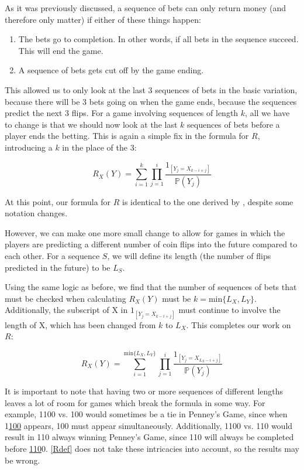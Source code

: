 \documentclass[english,12pt,a4paper,final]{article}
\begin{document}
As it was previously discussed, a sequence of bets can only return money (and therefore only matter) if either of these things happen:
\begin{enumerate}
	\item The bets go to completion. In other words, if all bets in the sequence succeed. This will end the game.
	\item A sequence of bets gets cut off by the game ending.
\end{enumerate}

This allowed us to only look at the last 3 sequences of bets in the basic variation, because there will be 3 bets going on when the game ends, because the sequences predict the next 3 flips. For a game involving sequences of length $k$, all we have to change is that we should now look at the last $k$ sequences of bets before a player ends the betting. This is again a simple fix in the formula for $R$, introducing a $k$ in the place of the 3:

\begin{equation}\label{RanyLength}
	R_X(Y) = \sum_{i=1}^{k} \prod_{j=1}^{i} \frac{1_{[Y_j = X_{k-i+j}]}}{\mathbb{P}(Y_j)}
\end{equation}

At this point, our formula for $R$ is identical to the one derived by \textcite{miller}, despite some notation changes.

However, we can make one more small change to allow for games in which the players are predicting a different number of coin flips into the future compared to each other. For a sequence $S$, we will define its length (the number of flips predicted in the future) to be $L_S$.

Using the same logic as before, we find that the number of sequences of bets that must be checked when calculating $R_X(Y)$ must be $k = \text{min}\{L_X, L_Y\}$. Additionally, the subscript of X in $1_{[Y_j = X_{k-i+j}]}$ must continue to involve the length of X, which has been changed from $k$ to $L_X$. This completes our work on $R$:

\begin{equation}\label{Rdef}
	R_{X}(Y) = \sum_{i=1}^{\text{min}\{L_{X}, L_{Y}\}} \prod_{j=1}^{i} \frac{1_{[Y_{j} = X_{L_{X} - i + j}]}}{\mathbb{P}(Y_{j})}
\end{equation}

It is important to note that having two or more sequences of different lengths leaves a lot of room for games which break the formula in some way. For example, 1100 vs. 100 would sometimes be a tie in Penney's Game, since when 1\underline{100} appears, 100 must appear simultaneously. Additionally, 1100 vs. 110 would result in 110 always winning Penney's Game, since 110 will always be completed before \underline{110}0. \eqref{Rdef} does not take these intricacies into account, so the results may be wrong.
\end{document}
